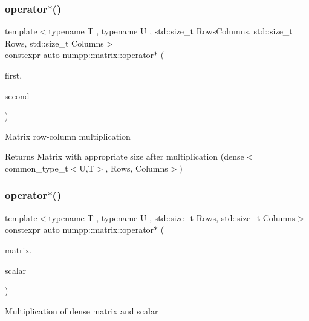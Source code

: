 \subsubsection{\texorpdfstring{operator$\ast$()}{operator*()}\hspace{0.1cm}{\footnotesize\ttfamily [1/3]}}
{\footnotesize\ttfamily template$<$typename T , typename U , std\+::size\+\_\+t Rows\+Columns, std\+::size\+\_\+t Rows, std\+::size\+\_\+t Columns$>$ \\
constexpr auto numpp\+::matrix\+::operator$\ast$ (\begin{DoxyParamCaption}\item[{const \hyperlink{classnumpp_1_1matrix_1_1dense}{dense}$<$ U, Rows, Rows\+Columns $>$ \&}]{first,  }\item[{const \hyperlink{classnumpp_1_1matrix_1_1dense}{dense}$<$ T, Rows\+Columns, Columns $>$ \&}]{second }\end{DoxyParamCaption})}

Matrix row-\/column multiplication

\begin{DoxyReturn}{Returns}
Matrix with appropriate size after multiplication (dense$<$common\+\_\+type\+\_\+t$<$\+U,\+T$>$, Rows, Columns$>$)
\end{DoxyReturn}
\mbox{\label{group__numpp__structures__matrices__dense_ga4ba3829a99216c5210cd95f49b703cf0}} 
\subsubsection{\texorpdfstring{operator$\ast$()}{operator*()}\hspace{0.1cm}{\footnotesize\ttfamily [2/3]}}
{\footnotesize\ttfamily template$<$typename T , typename U , std\+::size\+\_\+t Rows, std\+::size\+\_\+t Columns$>$ \\
constexpr auto numpp\+::matrix\+::operator$\ast$ (\begin{DoxyParamCaption}\item[{const \hyperlink{classnumpp_1_1matrix_1_1dense}{dense}$<$ T, Rows, Columns $>$ \&}]{matrix,  }\item[{const U}]{scalar }\end{DoxyParamCaption})}

Multiplication of dense matrix and scalar\mbox{\label{group__numpp__structures__matrices__dense_ga6eabf8b5b95a1aeea6b7dc2e4344619e}} 
